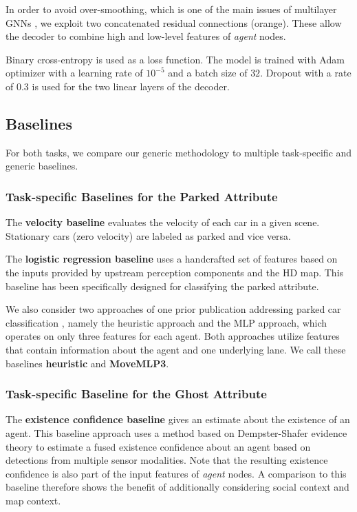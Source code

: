 \documentclass[letterpaper, 10 pt, journal, twoside]{IEEEtran}
\begin{document}
In order to avoid over-smoothing, which is one of the main issues of multilayer GNNs \cite{Zhou2020}, we exploit two concatenated residual connections (orange).
These allow the decoder to combine high and low-level features of \textit{agent} nodes.

Binary cross-entropy is used as a loss function.
The model is trained with Adam optimizer \cite{Kingma2015} with a learning rate of $10^{-5}$ and a batch size of $32$.
Dropout with a rate of $0.3$ is used for the two linear layers of the decoder.

\subsection{Baselines}
For both tasks, we compare our generic methodology to multiple task-specific and generic baselines.

\subsubsection{Task-specific Baselines for the Parked Attribute}
The \textbf{velocity baseline} evaluates the velocity of each car in a given scene.
Stationary cars (zero velocity) are labeled as parked and vice versa.

The \textbf{logistic regression baseline} uses a handcrafted set of features based on the inputs provided by upstream perception components and the HD map.
This baseline has been specifically designed for classifying the parked attribute.

We also consider two approaches of one prior publication addressing parked car classification \cite{Behrendt2019}, namely the heuristic approach and the MLP approach, which operates on only three features for each agent.
Both approaches utilize features that contain information about the agent and one underlying lane.
We call these baselines \textbf{heuristic} and \textbf{MoveMLP3}.

\subsubsection{Task-specific Baseline for the Ghost Attribute}
The \textbf{existence confidence baseline} gives an estimate about the existence of an agent.
This baseline approach \cite{Aeberhard2011} uses a method based on Dempster-Shafer evidence theory to estimate a fused existence confidence about an agent based on detections from multiple sensor modalities.
Note that the resulting existence confidence is also part of the input features of \textit{agent} nodes.
A comparison to this baseline therefore shows the benefit of additionally considering social context and map context.
\end{document}
